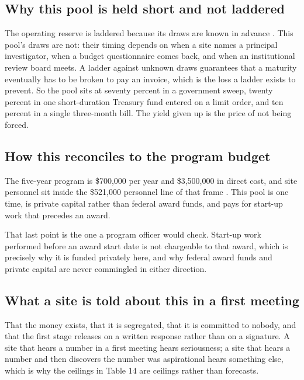 \subsection{Why this pool is held short and not laddered}

The operating reserve is laddered because its draws are known in advance
\cite{treasuryauctions2026}. This pool's draws are not: their timing depends on
when a site names a principal investigator, when a budget questionnaire comes
back, and when an institutional review board meets. A ladder against unknown
draws guarantees that a maturity eventually has to be broken to pay an invoice,
which is the loss a ladder exists to prevent. So the pool sits at seventy percent
in a government sweep, twenty percent in one short-duration Treasury fund entered
on a limit order, and ten percent in a single three-month bill. The yield given
up is the price of not being forced.

\subsection{How this reconciles to the program budget}

The five-year program is \$700,000 per year and \$3,500,000 in direct cost, and
site personnel sit inside the \$521,000 personnel line of that frame
\cite{tenapps2026,movein2026}. This pool is one time, is private capital rather
than federal award funds, and pays for start-up work that precedes an award.

That last point is the one a program officer would check. Start-up work performed
before an award start date is not chargeable to that award, which is precisely
why it is funded privately here, and why federal award funds and private capital
are never commingled in either direction.

\subsection{What a site is told about this in a first meeting}

That the money exists, that it is segregated, that it is committed to nobody, and
that the first stage releases on a written response rather than on a signature.
A site that hears a number in a first meeting hears seriousness; a site that
hears a number and then discovers the number was aspirational hears something
else, which is why the ceilings in Table 14 are ceilings rather than forecasts.
